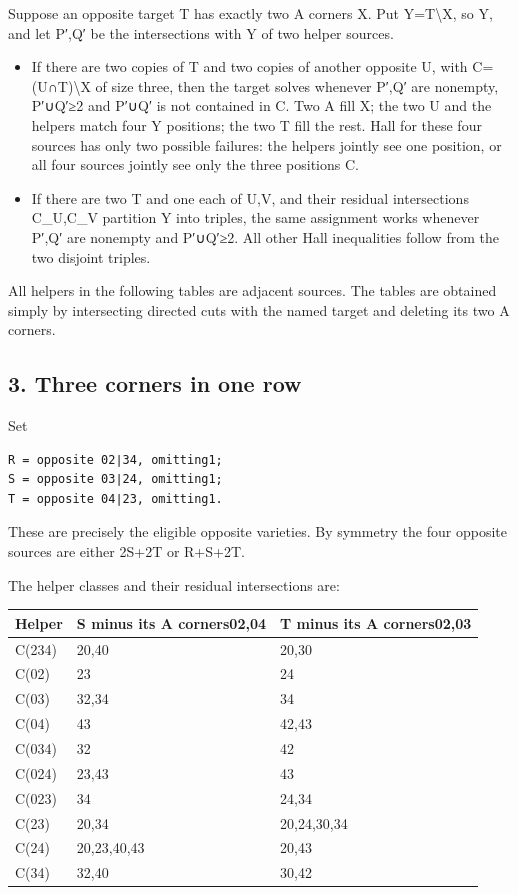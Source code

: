 \documentclass[
  10pt,
]{article}
\providecommand{\tightlist}{%
  \setlength{\itemsep}{0pt}\setlength{\parskip}{0pt}}
\begin{document}
Suppose an opposite target T has exactly two A corners X. Put
Y=T\textbackslash X, so \textbar Y, and let P′,Q′ be the
intersections with Y of two helper sources.

\begin{itemize}
\tightlist
\item
  If there are two copies of T and two copies of another opposite U,
  with C=(U∩T)\textbackslash X of size three, then the target solves
  whenever P′,Q′ are nonempty, \textbar P′∪Q′\textbar≥2 and P′∪Q′ is not
  contained in C. Two A fill X; the two U and the helpers match four Y
  positions; the two T fill the rest. Hall for these four sources has
  only two possible failures: the helpers jointly see one position, or
  all four sources jointly see only the three positions C.
\item
  If there are two T and one each of U,V, and their residual
  intersections C\_U,C\_V partition Y into triples, the same assignment
  works whenever P′,Q′ are nonempty and \textbar P′∪Q′\textbar≥2. All
  other Hall inequalities follow from the two disjoint triples.
\end{itemize}

All helpers in the following tables are adjacent sources. The tables are
obtained simply by intersecting directed cuts with the named target and
deleting its two A corners.

\hypertarget{three-corners-in-one-row}{%
\subsection*{3. Three corners in one
row}\label{three-corners-in-one-row}}

Set

\begin{verbatim}
R = opposite 02∣34, omitting1;
S = opposite 03∣24, omitting1;
T = opposite 04∣23, omitting1.
\end{verbatim}

These are precisely the eligible opposite varieties. By symmetry the
four opposite sources are either 2S+2T or R+S+2T.

The helper classes and their residual intersections are:

\begin{longtable}[]{@{}lll@{}}
\toprule\noalign{}
Helper & S minus its A corners02,04 & T minus its A corners02,03 \\
\midrule\noalign{}
\endhead
\bottomrule\noalign{}
\endlastfoot
C(234) & 20,40 & 20,30 \\
C(02) & 23 & 24 \\
C(03) & 32,34 & 34 \\
C(04) & 43 & 42,43 \\
C(034) & 32 & 42 \\
C(024) & 23,43 & 43 \\
C(023) & 34 & 24,34 \\
C(23) & 20,34 & 20,24,30,34 \\
C(24) & 20,23,40,43 & 20,43 \\
C(34) & 32,40 & 30,42 \\
\end{longtable}
\end{document}
